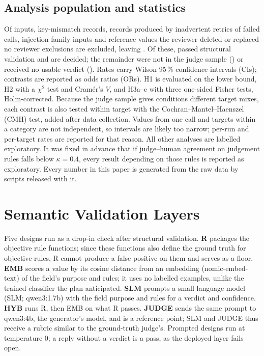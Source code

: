 \documentclass[conference]{IEEEtran}
\begin{document}
\subsection{Analysis population and statistics}
Of  inputs,  key-mismatch records,  records produced
by inadvertent retries of failed calls,  injection-family inputs and\ifreviewed{}
 reference values the reviewer deleted or replaced\else{} no reviewer exclusions\fi{}
are excluded, leaving . Of these,  passed structural validation and  are
decided; the remainder were not in the judge sample () or received no usable
verdict (). Rates carry Wilson 95\,\% confidence intervals (CIs); contrasts are reported as odds ratios (ORs). H1 is evaluated on the lower
bound, H2 with a $\chi^2$ test and Cram\'er's $V$, and H3a--c with three one-sided Fisher tests,
Holm-corrected. Because the judge sample gives conditions different target mixes, each contrast is
also tested within target with the Cochran--Mantel--Haenszel (CMH) test, added after data collection.
Values from one call and targets within a category are not independent, so intervals are likely
too narrow; per-run and per-target rates are reported for that reason. All other analyses are
labelled exploratory. It was fixed in advance that if judge--human agreement on judgement rules falls
below $\kappa=0.4$, every result depending on those rules is reported as exploratory. Every number in
this paper is generated from the raw data by scripts released with it.

\section{Semantic Validation Layers}
\label{sec:layer}

Five designs run as a drop-in check after structural validation. \textbf{R} packages the objective
rule functions; since these functions also define the ground truth for objective rules, R cannot
produce a false positive on them and serves as a floor. \textbf{EMB} scores a value by its cosine
distance from an embedding (nomic-embed-text) of the field's purpose and rules; it uses no labelled
examples, unlike the trained classifier the plan anticipated. \textbf{SLM} prompts a small language
model (SLM; qwen3:1.7b) with the field purpose and rules for a verdict and confidence. \textbf{HYB} runs
R, then EMB on what R passes. \textbf{JUDGE} sends the same prompt to qwen3:4b, the generator's model,
and is a reference point; SLM and JUDGE thus receive a rubric similar to the ground-truth judge's.
Prompted designs run at temperature 0; a reply without a verdict is a pass, as the deployed layer
fails open.
\end{document}

